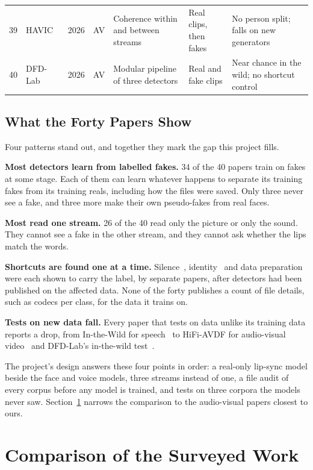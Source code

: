 {\begin{longtable}{@{}r >{\raggedright\arraybackslash}p{2.5cm} c c >{\raggedright\arraybackslash}p{3.9cm} >{\raggedright\arraybackslash}p{2.5cm} >{\raggedright\arraybackslash}p{3.5cm}@{}}
        39 & HAVIC~\cite{havic} & 2026 & AV & Coherence within and between streams & Real clips, then fakes & No person split; falls on new generators \\
        40 & DFD-Lab~\cite{dfdlab2026} & 2026 & AV & Modular pipeline of three detectors & Real and fake clips & Near chance in the wild; no shortcut control \\
\end{longtable}
}

\subsection{What the Forty Papers Show}

Four patterns stand out, and together they mark the gap this project fills.

\textbf{Most detectors learn from labelled fakes.} 34 of the 40 papers
train on fakes at some stage. Each of them can learn whatever happens to
separate its training fakes from its training reals, including how the files
were saved. Only three never see a fake, and three more
make their own pseudo-fakes from real faces.

\textbf{Most read one stream.} 26 of the 40 read only the picture or
only the sound. They cannot see a fake in the other stream, and they cannot
ask whether the lips match the words.

\textbf{Shortcuts are found one at a time.} Silence~\cite{mueller2021,smeu2025},
identity~\cite{dong2023} and data preparation~\cite{deepfakebench} were each
shown to carry the label, by separate papers, after detectors had been
published on the affected data. None of the forty publishes a count of file
details, such as codecs per class, for the data it trains on.

\textbf{Tests on new data fall.} Every paper that tests on data unlike its
training data reports a drop, from In-the-Wild for speech~\cite{mueller2022}
to HiFi-AVDF for audio-visual video~\cite{havic} and DFD-Lab's in-the-wild
test~\cite{dfdlab2026}.

The project's design answers these four points in order: a real-only lip-sync
model beside the face and voice models, three streams instead of one, a file
audit of every corpus before any model is trained, and tests on three corpora
the models never saw. Section~\ref{sec:l-compare} narrows the comparison to
the audio-visual papers closest to ours.

\section{Comparison of the Surveyed Work}
\label{sec:l-compare}

